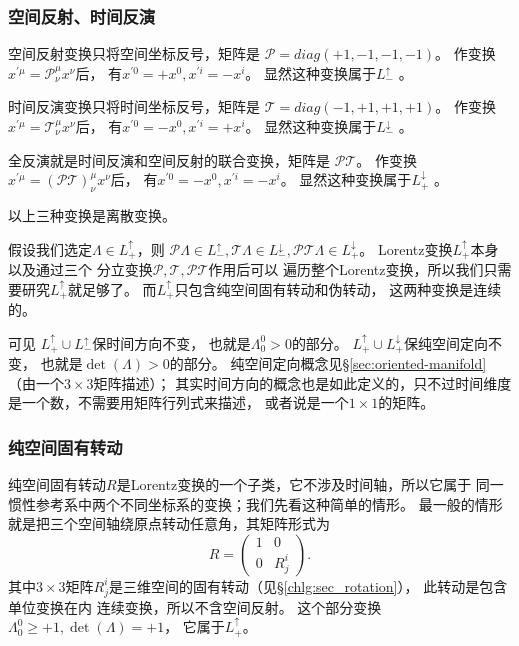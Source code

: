\subsubsection{空间反射、时间反演}
空间反射变换只将空间坐标反号，矩阵是
$\mathcal{P} = diag (+1,-1,-1,-1)$。
作变换$x^{\prime \mu}=\mathcal{P}^\mu _\nu x^{\nu}$后，
有$x^{\prime 0}=+x^0, x^{\prime i}= -x^i$。
显然这种变换属于$L^{\uparrow}_{-}$ 。

时间反演变换只将时间坐标反号，矩阵是
$\mathcal{T} = diag (-1,+1,+1,+1)$。
作变换$x^{\prime \mu}=\mathcal{T}^\mu _\nu x^{\nu}$后，
有$x^{\prime 0}=-x^0, x^{\prime i}= +x^i$。
显然这种变换属于$L^{\downarrow}_{-}$ 。

全反演就是时间反演和空间反射的联合变换，矩阵是
$\mathcal{PT}$。
作变换$x^{\prime \mu}=(\mathcal{PT})^\mu _\nu x^{\nu}$后，
有$x^{\prime 0}=-x^0, x^{\prime i}= -x^i$。
显然这种变换属于$L^{\downarrow}_{+}$ 。

以上三种变换是离散变换。

假设我们选定$\Lambda  \in  L^{\uparrow}_{+}$，则
$\mathcal{P}\Lambda  \in  L^{\uparrow}_{-},
\mathcal{T}\Lambda  \in  L^{\downarrow}_{-},
\mathcal{PT}\Lambda \in  L^{\downarrow}_{+}$。
Lorentz变换$L^{\uparrow}_{+}$本身以及通过三个
分立变换$\mathcal{P},\mathcal{T},\mathcal{PT}$作用后可以
遍历整个Lorentz变换，所以我们只需要研究$L^{\uparrow}_{+}$就足够了。
而$L^{\uparrow}_{+}$只包含纯空间固有转动和伪转动，
这两种变换是连续的。

可见 $L^{\uparrow}_{+}\cup L^{\uparrow}_{-}$保时间方向不变，
也就是$\Lambda^0_0 >0$的部分。
$L^{\uparrow}_{+}\cup L^{\downarrow}_{+}$保纯空间定向不变，
也就是$\det (\Lambda) >0$的部分。
纯空间定向概念见\S\ref{sec:oriented-manifold}（由一个$3\times 3$矩阵描述）；
其实时间方向的概念也是如此定义的，只不过时间维度是一个数，不需要用矩阵行列式来描述，
或者说是一个$1\times 1$的矩阵。

\subsubsection{纯空间固有转动}
纯空间固有转动$R$是Lorentz变换的一个子类，它不涉及时间轴，所以它属于
同一惯性参考系中两个不同坐标系的变换；我们先看这种简单的情形。
最一般的情形就是把三个空间轴绕原点转动任意角，其矩阵形式为
\begin{equation} \label{chlg:eqn_rotation-4d}
    R = \begin{pmatrix}
        1    & 0  \\
        0 & R^i_{j}
    \end{pmatrix} .
\end{equation}
其中$3\times 3$矩阵$R^i_{j}$是三维空间的固有转动（见\S\ref{chlg:sec_rotation}），
此转动是包含单位变换在内
连续变换，所以不含空间反射。 这个部分变换
$\Lambda^{0}_{0}\geqslant +1, \det(\Lambda)=+1$，
它属于$L^{\uparrow}_{+}$。

